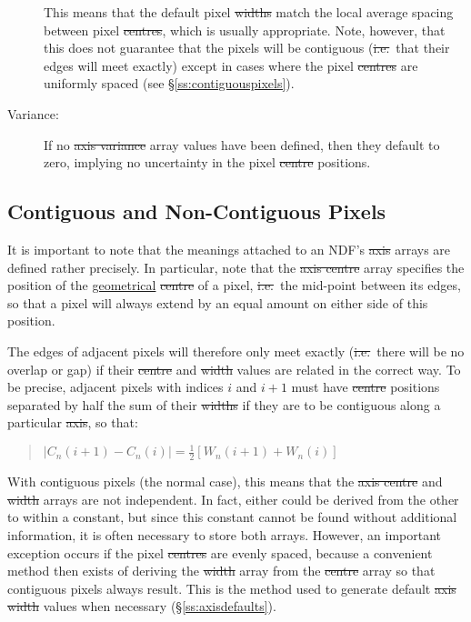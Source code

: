 \begin{description}
This means that the default pixel \st{widths\/} match the local average
spacing between pixel \st{centres\/}, which is usually appropriate. 
Note, however, that this does not guarantee that the pixels will be
contiguous (\st{i.e.}\ that their edges will meet exactly) except in cases
where the pixel \st{centres\/} are uniformly spaced (see
\S\ref{ss:contiguouspixels}). 

\item[Variance:]
If no \st{axis variance\/} array values have been defined, then they
default to zero, implying no uncertainty in the pixel \st{centre\/}
positions. 

\end{description}

\subsection{\label{ss:contiguouspixels}Contiguous and Non-Contiguous Pixels}

It is important to note that the meanings attached to an NDF's \st{axis\/}
arrays are defined rather precisely. 
In particular, note that the \st{axis centre\/} array specifies the
position of the \underline{geometrical} \st{centre\/} of a pixel,
\st{i.e.}\ the mid-point between its edges, so that a pixel will
always extend 
by an equal amount on either side of this position. 

The edges of adjacent pixels will therefore only meet exactly
(\st{i.e.}\ there will be no overlap or gap) if their \st{centre\/}
and \st{width\/} values are related in the correct way. 
To be precise, adjacent pixels with indices $i$ and $i+1$ must have
\st{centre\/} positions separated by half the sum of their \st{widths\/} if 
they are to be contiguous along a particular \st{axis}, so that: 

\small
\begin{quote}
\begin{center}
$|C_{n}(i+1) - C_{n}(i)| = \frac{1}{2} [W_{n}(i+1) + W_{n}(i)]$
\end{center}
\end{quote}
\normalsize

With contiguous pixels (the normal case), this means that the \st{axis 
centre\/} and \st{width\/} arrays are not independent.
In fact, either could be derived from the other to within a constant,
but since this constant cannot be found without additional information,
it is often necessary to store both arrays. 
However, an important exception occurs if the pixel \st{centres\/} are
evenly spaced, because a convenient method then exists of deriving the
\st{width\/} array from the \st{centre\/} array so that contiguous
pixels 
always result.
This is the method used to generate default \st{axis width\/} values when
necessary (\S\ref{ss:axisdefaults}). 

